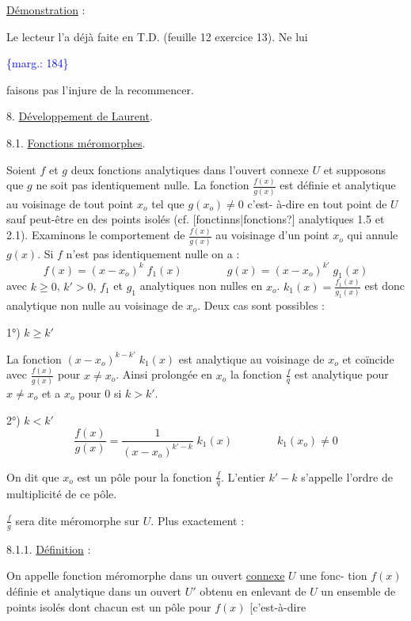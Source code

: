 \documentclass[11pt]{article}
\newcommand{\scanpage}[1]{\par\bigskip\noindent{\small\sffamily[scan #1]}\par}
\newcommand{\mspage}[1]{{\small\sffamily[p.\,#1]}}
\newcommand{\margin}[1]{\textcolor{blue}{\{\textsf{marg.:} #1\}}}
\newcommand{\uline}[1]{\underline{#1}}
\newcommand{\unsure}[1]{[#1?]}
\begin{document}
\uline{Démonstration} :

Le lecteur l'a déjà faite en T.D. (feuille 12 exercice 13). Ne lui

\margin{184}

\clearpage
\scanpage{119/185}
\mspage{- 4 -}

faisons pas l'injure de la recommencer.

8. \uline{Développement de Laurent}.

8.1. \uline{Fonctions méromorphes}.

Soient $f$ et $g$ deux fonctions analytiques dans l'ouvert connexe $U$
et supposons que $g$ ne soit pas identiquement nulle. La fonction $\frac{f(x)}{g(x)}$ est
définie et analytique au voisinage de tout point $x_o$ tel que $g(x_o) \neq 0$ c'est-%
à-dire en tout point de $U$ sauf peut-être en des points isolés (cf. \unsure{fonctinns|fonctions}
analytiques 1.5 et 2.1). Examinons le comportement de $\frac{f(x)}{g(x)}$ au voisinage d'un
point $x_o$ qui annule $g(x)$. Si $f$ n'est pas identiquement nulle on a :
\[ f(x) = (x - x_o)^k \; f_1(x) \qquad\qquad g(x) = (x - x_o)^{k'} \; g_1(x) \]
avec $k \geq 0$, $k' > 0$, $f_1$ et $g_1$ analytiques non nulles en $x_o$. $k_1(x) = \frac{f_1(x)}{g_1(x)}$
est donc analytique non nulle au voisinage de $x_o$.
Deux cas sont possibles :

1°) \uline{$k \geq k'$}

La fonction $(x - x_o)^{k-k'} \; k_1(x)$ est analytique au voisinage de $x_o$
et coïncide avec $\frac{f(x)}{g(x)}$ pour $x \neq x_o$. Ainsi prolongée en $x_o$ la fonction $\frac{f}{q}$
est analytique pour $x \neq x_o$ et a $x_o$ pour 0 si $k > k'$.

2°) \uline{$k < k'$}
\[ \frac{f(x)}{g(x)} = \frac{1}{(x-x_o)^{k'-k}} \; k_1(x) \qquad\qquad k_1(x_o) \neq 0 \]

On dit que $x_o$ est un pôle pour la fonction $\frac{f}{q}$. L'entier $k'-k$ s'appelle
l'ordre de multiplicité de ce pôle.

$\frac{f}{g}$ sera dite méromorphe sur $U$. Plus exactement :

8.1.1. \uline{Définition} :

On appelle fonction méromorphe dans un ouvert \uline{connexe} $U$ une fonc-%
tion $f(x)$ définie et analytique dans un ouvert $U'$ obtenu en enlevant de $U$
un ensemble de points isolés dont chacun est un pôle pour $f(x)$ [c'est-à-dire
\end{document}
